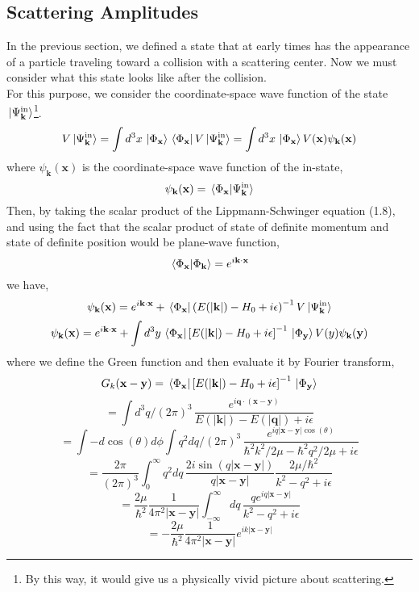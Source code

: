 \documentclass[12pt]{article}
\numberwithin{equation}{section}
\begin{document}
\subsection{Scattering Amplitudes}
In the previous section, we defined a state that at early times has the appearance of a particle traveling toward a collision with a scattering center. 
Now we must consider what this state looks like after the collision.
\\\indent For this purpose, we consider the coordinate-space wave function of the state $\ket*{\Psi_{\mathbf{k}}^{\text{in}}}$\footnote{By this way, it would give us a physically vivid picture about scattering.}.
\begin{equation}
    V\ket*{\Psi_{\mathbf{k}}^{\text{in}}} = \int{d^3x\,\ket*{\Phi_{\mathbf{x}}}\bra*{\Phi_{\mathbf{x}}}V\ket*{\Psi_{\mathbf{k}}^{\text{in}}}} = \int{d^3x\,\ket*{\Phi_{\mathbf{x}}}V(\mathbf{x})\psi_{\mathbf{k}}(\mathbf{x})}
\end{equation}
where $\psi_{\mathbf{k}}(\mathbf{x})$ is the coordinate-space wave function of the in-state,
\begin{equation}
    \psi_{\mathbf{k}}(\mathbf{x}) = \braket*{\Phi_{\mathbf{x}}}{\Psi_{\mathbf{k}}^{\text{in}}}
\end{equation}
Then, by taking the scalar product of the Lippmann-Schwinger equation (1.8), and using the fact that the scalar product of state of definite momentum and state of definite position would be plane-wave function,
\[\braket*{\Phi_{\mathbf{x}}}{\Phi_{\mathbf{k}}} = e^{i\mathbf{k}\cdot\mathbf{x}}\]
we have,
\[\psi_{\mathbf{k}}(\mathbf{x}) = e^{i\mathbf{k}\cdot\mathbf{x}} + \bra*{\Phi_{\mathbf{x}}}\left(E(|\mathbf{k}|)-H_0+i\epsilon\right)^{-1}V\ket*{\Psi_{\mathbf{k}}^{\text{in}}}\]
\begin{equation}
    \psi_{\mathbf{k}}(\mathbf{x}) = e^{i\mathbf{k}\cdot\mathbf{x}} + \int{d^3y\,\bra*{\Phi_{\mathbf{x}}}\left[E(|\mathbf{k}|)-H_0+i\epsilon\right]^{-1}\ket*{\Phi_{\mathbf{y}}}V(y)\psi_{\mathbf{k}}(\mathbf{y})}
\end{equation}
where we define the Green function and then evaluate it by Fourier transform,
\[
    G_{k}(\mathbf{x}-\mathbf{y}) = \bra*{\Phi_{\mathbf{x}}}\left[E(|\mathbf{k}|)-H_0+i\epsilon\right]^{-1}\ket*{\Phi_{\mathbf{y}}}
\]
\[ = \int{d^3q/(2\pi)^3\,\frac{e^{i\mathbf{q}\cdot(\mathbf{x}-\mathbf{y})}}{E(|\mathbf{k}|)-E(|\mathbf{q}|)+i\epsilon}}\]
\[=\int{-d\cos(\theta) d\phi}\int{q^2dq/(2\pi)^3\,\frac{e^{iq|\mathbf{x}-\mathbf{y}|\cos(\theta)}}{\hbar^2k^2/2\mu-\hbar^2q^2/2\mu+i\epsilon}}\]
\[ = \frac{2\pi}{(2\pi)^3}\int_{0}^{\infty}{q^2dq\,\frac{2i\sin(q|\mathbf{x}-\mathbf{y}|)}{q|\mathbf{x}-\mathbf{y}|}\frac{2\mu/\hbar^2}{k^2-q^2+i\epsilon}}\]
\[=\frac{2\mu}{\hbar^2}\frac{1}{4\pi^2|\mathbf{x}-\mathbf{y}|}\int_{-\infty}^{\infty}{dq\,\frac{qe^{iq|\mathbf{x}-\mathbf{y}|}}{k^2-q^2+i\epsilon}}\]
\begin{equation}
    =-\frac{2\mu}{\hbar^2}\frac{1}{4\pi^2|\mathbf{x}-\mathbf{y}|}e^{ik|\mathbf{x}-\mathbf{y}|}
\end{equation}
\end{document}
